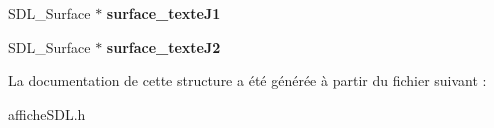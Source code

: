 \begin{DoxyCompactItemize}
\item 
\hypertarget{struct_jeu_s_d_l_ae098fa0806e909503f540634485ae838}{S\-D\-L\-\_\-\-Surface $\ast$ {\bfseries surface\-\_\-texte\-J1}}\label{struct_jeu_s_d_l_ae098fa0806e909503f540634485ae838}

\item 
\hypertarget{struct_jeu_s_d_l_ae17e5d5097d9a63154a63d0e4dfba6f2}{S\-D\-L\-\_\-\-Surface $\ast$ {\bfseries surface\-\_\-texte\-J2}}\label{struct_jeu_s_d_l_ae17e5d5097d9a63154a63d0e4dfba6f2}

\end{DoxyCompactItemize}


La documentation de cette structure a été générée à partir du fichier suivant \-:\begin{DoxyCompactItemize}
\item 
affiche\-S\-D\-L.\-h\end{DoxyCompactItemize}
